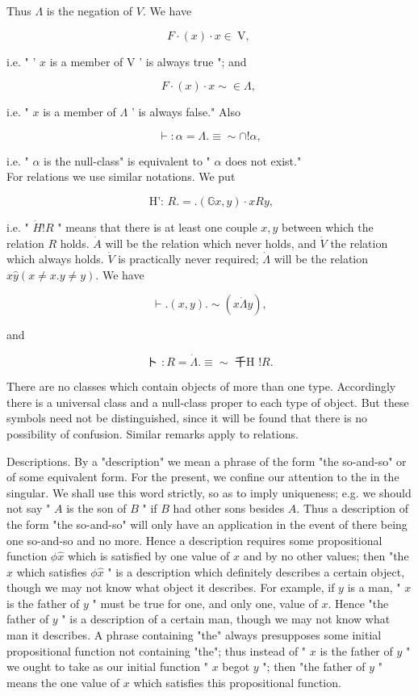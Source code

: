 \documentclass[10pt]{article}
\begin{document}
Thus $\Lambda$ is the negation of $V$. We have

$$
F \cdot(x) \cdot x \in \mathrm{~V} \text {, }
$$

i.e. " ' $x$ is a member of V ' is always true "; and

$$
F \cdot(x) \cdot x \sim \in \Lambda \text {, }
$$

i.e. " $x$ is a member of $\Lambda$ ' is always false." Also

$$
\vdash: \alpha=\Lambda . \equiv \sim \cap!\alpha,
$$

i.e. " $\alpha$ is the null-class" is equivalent to " $\alpha$ does not exist."\\
For relations we use similar notations. We put

$$
\text { H': } R .=.(\mathbb{G} x, y) \cdot x R y,
$$

i.e. " $\dot{H}!R$ " means that there is at least one couple $x, y$ between which the relation $R$ holds. $\dot{A}$ will be the relation which never holds, and $\dot{V}$ the relation which always holds. $\dot{V}$ is practically never required; $\dot{\Lambda}$ will be the relation $\hat{x} \hat{y}(x \neq x . y \neq y)$. We have

$$
\vdash .(x, y) . \sim(x \dot{\Lambda} y),
$$

and

$$
\text { ト }: R=\dot{\Lambda} . \equiv \sim \text { 千H }!R \text {. }
$$

There are no classes which contain objects of more than one type. Accordingly there is a universal class and a null-class proper to each type of object. But these symbols need not be distinguished, since it will be found that there is no possibility of confusion. Similar remarks apply to relations.

Descriptions. By a "description" we mean a phrase of the form "the so-and-so" or of some equivalent form. For the present, we confine our attention to the in the singular. We shall use this word strictly, so as to imply uniqueness; e.g. we should not say " $A$ is the son of $B$ " if $B$ had other sons besides $A$. Thus a description of the form "the so-and-so" will only have an application in the event of there being one so-and-so and no more. Hence a description requires some propositional function $\phi \hat{x}$ which is satisfied by one value of $x$ and by no other values; then "the $x$ which satisfies $\phi \hat{x}$ " is a description which definitely describes a certain object, though we may not know what object it describes. For example, if $y$ is a man, " $x$ is the father of $y$ " must be true for one, and only one, value of $x$. Hence "the father of $y$ " is a description of a certain man, though we may not know what man it describes. A phrase containing "the" always presupposes some initial propositional function not containing "the"; thus instead of " $x$ is the father of $y$ " we ought to take as our initial function " $x$ begot $y$ "; then "the father of $y$ " means the one value of $x$ which satisfies this propositional function.
\end{document}
